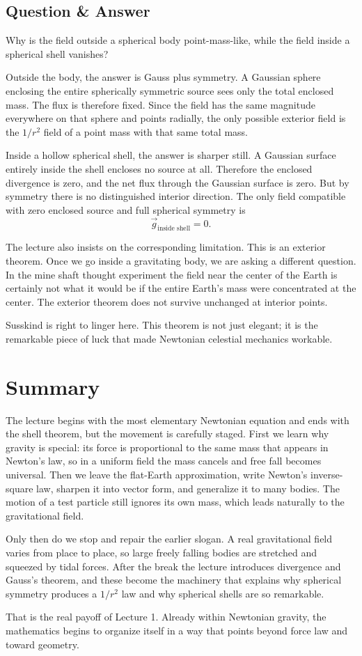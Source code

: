 \subsection{Question \& Answer}

Why is the field outside a spherical body point-mass-like, while the field inside a spherical shell vanishes?

Outside the body, the answer is Gauss plus symmetry. A Gaussian sphere enclosing the entire spherically symmetric source sees only the total enclosed mass. The flux is therefore fixed. Since the field has the same magnitude everywhere on that sphere and points radially, the only possible exterior field is the \(1/r^2\) field of a point mass with that same total mass.

Inside a hollow spherical shell, the answer is sharper still. A Gaussian surface entirely inside the shell encloses no source at all. Therefore the enclosed divergence is zero, and the net flux through the Gaussian surface is zero. But by symmetry there is no distinguished interior direction. The only field compatible with zero enclosed source and full spherical symmetry is
\[
\vec g_{\text{inside shell}}=0.
\]

The lecture also insists on the corresponding limitation. This is an exterior theorem. Once we go inside a gravitating body, we are asking a different question. In the mine shaft thought experiment the field near the center of the Earth is certainly not what it would be if the entire Earth's mass were concentrated at the center. The exterior theorem does not survive unchanged at interior points.

Susskind is right to linger here. This theorem is not just elegant; it is the remarkable piece of luck that made Newtonian celestial mechanics workable.

\section{Summary}

The lecture begins with the most elementary Newtonian equation and ends with the shell theorem, but the movement is carefully staged. First we learn why gravity is special: its force is proportional to the same mass that appears in Newton's law, so in a uniform field the mass cancels and free fall becomes universal. Then we leave the flat-Earth approximation, write Newton's inverse-square law, sharpen it into vector form, and generalize it to many bodies. The motion of a test particle still ignores its own mass, which leads naturally to the gravitational field.

Only then do we stop and repair the earlier slogan. A real gravitational field varies from place to place, so large freely falling bodies are stretched and squeezed by tidal forces. After the break the lecture introduces divergence and Gauss's theorem, and these become the machinery that explains why spherical symmetry produces a \(1/r^2\) law and why spherical shells are so remarkable.

That is the real payoff of Lecture 1. Already within Newtonian gravity, the mathematics begins to organize itself in a way that points beyond force law and toward geometry.
